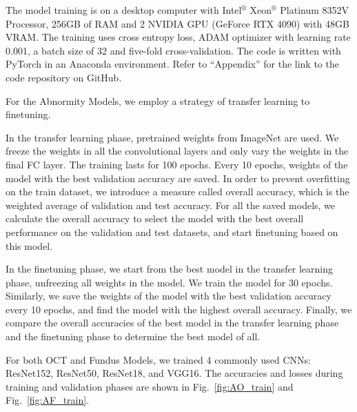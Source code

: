 \documentclass{article}
\begin{document}
	The model training is on a desktop computer with Intel$^®$ Xeon$^®$ Platinum 8352V Processor, 256GB of RAM and 2 NVIDIA GPU (GeForce RTX 4090) with 48GB VRAM. The training uses cross entropy loss, ADAM optimizer with learning rate 0.001, a batch size of 32 and five-fold cross-validation. The code is written with PyTorch in an Anaconda environment. Refer to ``Appendix'' for the link to the code repository on GitHub. 
	
	\vspace{0.3cm}
	
	For the Abnormity Models, we employ a strategy of transfer learning to finetuning. 
	
	In the transfer learning phase, pretrained weights from ImageNet \autocite{Krizhevsky_Sutskever_Hinton_2017} are used. We freeze the weights in all the convolutional layers and only vary the weights in the final FC layer. The training lasts for 100 epochs. Every 10 epochs, weights of the model with the best validation accuracy are saved. In order to prevent overfitting on the train dataset, we introduce a measure called overall accuracy, which is the weighted average of validation and test accuracy. For all the saved models, we calculate the overall accuracy to select the model with the best overall performance on the validation and test datasets, and start finetuning based on this model. 
	
	In the finetuning phase, we start from the best model in the transfer learning phase, unfreezing all weights in the model. We train the model for 30 epochs. Similarly, we save the weights of the model with the best validation accuracy every 10 epochs, and find the model with the highest overall accuracy. Finally, we compare the overall accuracies of the best model in the transfer learning phase and the finetuning phase to determine the best model of all. 
	
	For both OCT and Fundus Models, we trained 4 commonly used CNNs: ResNet152, ResNet50, ResNet18, and VGG16. The accuracies and losses during training and validation phases are shown in Fig.~\ref{fig:AO_train} and Fig.~\ref{fig:AF_train}. 
	
\end{document}
